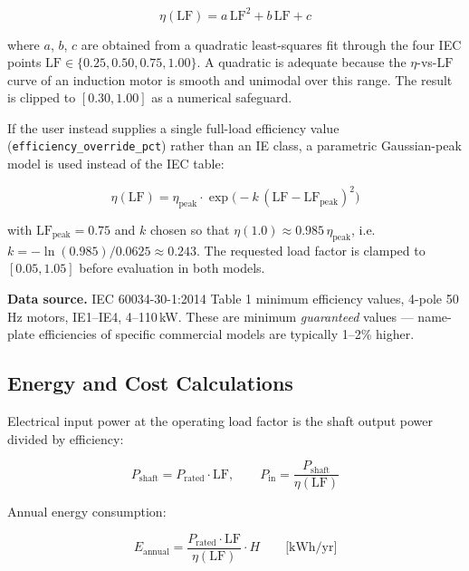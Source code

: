 \documentclass[11pt,a4paper]{article}
\newcommand{\code}[1]{\texttt{#1}}
\begin{document}
\begin{equation}
\eta(\mathrm{LF}) = a\,\mathrm{LF}^2 + b\,\mathrm{LF} + c
\end{equation}

where $a$, $b$, $c$ are obtained from a quadratic least-squares fit through
the four IEC points $\mathrm{LF} \in \{0.25, 0.50, 0.75, 1.00\}$. A quadratic
is adequate because the $\eta$-vs-$\mathrm{LF}$ curve of an induction motor
is smooth and unimodal over this range. The result is clipped to $[0.30,
1.00]$ as a numerical safeguard.

If the user instead supplies a single full-load efficiency value
(\code{efficiency\_override\_pct}) rather than an IE class, a parametric
Gaussian-peak model is used instead of the IEC table:

\begin{equation}
\eta(\mathrm{LF}) = \eta_{\mathrm{peak}} \cdot
    \exp\!\big(-k\,(\mathrm{LF} - \mathrm{LF}_{\mathrm{peak}})^2\big)
\end{equation}

with $\mathrm{LF}_{\mathrm{peak}} = 0.75$ and $k$ chosen so that
$\eta(1.0) \approx 0.985\,\eta_{\mathrm{peak}}$, i.e.\
$k = -\ln(0.985)/0.0625 \approx 0.243$. The requested load factor is clamped
to $[0.05, 1.05]$ before evaluation in both models.

\textbf{Data source.} IEC 60034-30-1:2014 Table 1 minimum efficiency values,
4-pole 50\,Hz motors, IE1--IE4, 4--110\,kW. These are minimum \emph{guaranteed}
values --- name-plate efficiencies of specific commercial models are
typically 1--2\% higher.

\subsection{Energy and Cost Calculations}

Electrical input power at the operating load factor is the shaft output
power divided by efficiency:

\begin{equation}
P_{\mathrm{shaft}} = P_{\mathrm{rated}} \cdot \mathrm{LF}, \qquad
P_{\mathrm{in}} = \frac{P_{\mathrm{shaft}}}{\eta(\mathrm{LF})}
\end{equation}

Annual energy consumption:

\begin{equation}
E_{\mathrm{annual}} = \frac{P_{\mathrm{rated}} \cdot \mathrm{LF}}{\eta(\mathrm{LF})} \cdot H
\qquad \text{[kWh/yr]}
\end{equation}
\end{document}
